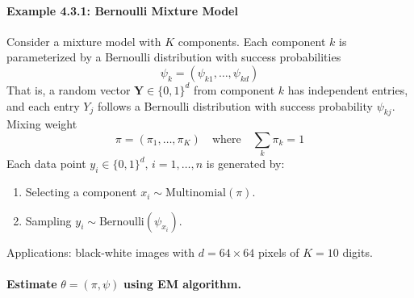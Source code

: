 \documentclass[12pt]{book}
\theoremstyle{definition}
\theoremstyle{remark}
\begin{document}
\paragraph{Example 4.3.1: Bernoulli Mixture Model}
Consider a mixture model with \(K\) components. Each component \(k\) is parameterized by a Bernoulli distribution with success probabilities 
    \[\psi_k = (\psi_{k1}, \dots, \psi_{kd})\]
That is, a random vector \(\mathbf{Y} \in \{0,1\}^d\) from component \(k\) has independent entries, and each entry \(Y_j\) follows a Bernoulli distribution with success probability \(\psi_{kj}\).\\Mixing weight 
\[\pi = (\pi_1, \dots, \pi_K) \quad \text{where} \quad \sum_k \pi_k = 1\]
Each data point \(y_i \in \{0,1\}^d, \, i = 1, \dots, n\) is generated by:
\begin{enumerate}
        \item Selecting a component \(x_i \sim \text{Multinomial}(\pi)\).
        \item Sampling \(y_i \sim \text{Bernoulli}(\psi_{x_i})\).
    \end{enumerate}
Applications: black-white images with \(d = 64 \times 64\) pixels of \(K = 10\) digits.\\
\\

\textbf{Estimate} \(\theta = (\pi, \psi)\) \textbf{using EM algorithm.}\\
\end{document}
